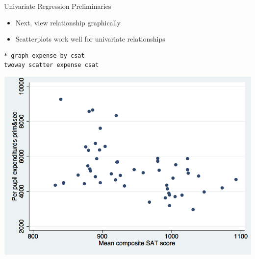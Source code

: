 \documentclass[table,smaller]{beamer}
\begin{document}
\begin{frame}[fragile,label=sec-2-3]{Univariate Regression Preliminaries}
 \begin{itemize}
\item Next, view relationship graphically
\item Scatterplots work well for univariate relationships
\end{itemize}



\begin{verbatim}
* graph expense by csat
twoway scatter expense csat
\end{verbatim}


\includegraphics[width=.6\textwidth]{images/scatter1.png}
\end{frame}
\end{document}
